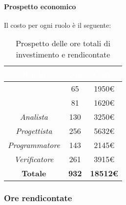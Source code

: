 \paragraph{Prospetto economico}
Il costo per ogni ruolo è il seguente:
\begin{table}[H]
	\begin{center}
		\begin{tabular}{ c c c }
		\rowcolor{darkblue} 
		\textcolor{white}{\textbf{Ruolo}} & \textcolor{white}{\textbf{Ore}} & \textcolor{white}{\textbf{Costo}} \\ \hline
		\textit{\Responsabile} & 65 & 1950€ \\ \hline
		\textit{\Amministratore} & 81 & 1620€ \\ \hline
		\textit{Analista} & 130 & 3250€ \\ \hline
		\textit{Progettista} & 256 & 5632€ \\ \hline
		\textit{Programmatore}  & 143 & 2145€ \\ \hline
		\textit{Verificatore} & 261 & 3915€ \\ \hline
		\textbf{Totale} & \textbf{932} & \textbf{18512€} \\  \hline
		\end{tabular}
	\caption{ Prospetto delle ore totali di investimento e rendicontate}
	\end{center}
\end{table}
\subsubsection{Ore rendicontate}
